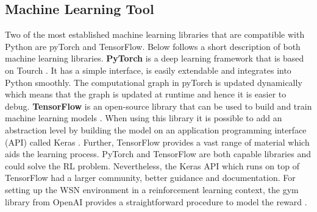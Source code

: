 \subsection{Machine Learning Tool}
Two of the most established machine learning libraries that are compatible with Python are pyTorch and TensorFlow. Below follows a short description of both machine learning libraries. \newline
\newline
\noindent \textbf{PyTorch} is a deep learning framework that is based on Tourch \cite{paszke2017automatic}. It has a simple interface, is easily extendable and integrates into Python smoothly. The computational graph in pyTorch is updated dynamically which means that the graph is updated at runtime and hence it is easier to debug. \newline 
\newline
\noindent \textbf{TensorFlow} is an open-source library that can be used to build and train machine learning models \cite{tensorflow2015-whitepaper}. When using this library it is possible to add an abstraction level by building the model on an application programming interface (API) called Keras \cite{chollet2015keras}. Further, TensorFlow provides a vast range of material which aids the learning process.\newline   
\newline 
\noindent PyTorch and TensorFlow are both capable libraries and could solve the RL problem. Nevertheless, the Keras API which runs on top of TensorFlow had a larger community, better guidance and documentation. For setting up the WSN environment in a reinforcement learning context, the gym library from OpenAI provides a straightforward procedure to model the reward \cite{open160601540}.


